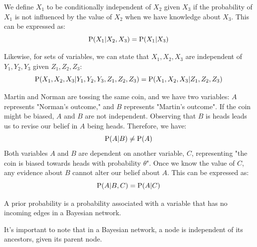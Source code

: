 \begin{definition}
    We define $X_1$ to be conditionally independent of $X_2$ given $X_3$ if the probability of $X_1$ is not influenced by the value of $X_2$ when we have knowledge about $X_3$.  
    This can be expressed as:
    \[\textnormal{P}(X_1|X_2,X_3)=\textnormal{P}(X_1|X_3)\]
\end{definition}
Likewise, for sets of variables, we can state that $X_1, X_2, X_3$ are independent of $Y_1, Y_2, Y_3$ given $Z_1,Z_2,Z_3$:
\[\textnormal{P}(X_1,X_2,X_3|Y_1,Y_2,Y_3,Z_1,Z_2,Z_3)=\textnormal{P}(X_1,X_2,X_3|Z_1,Z_2,Z_3)\]
\begin{example}
    Martin and Norman are tossing the same coin, and we have two variables: $A$ represents "Norman's outcome," and $B$ represents "Martin's outcome". 
    If the coin might be biased, $A$ and $B$ are not independent. 
    Observing that $B$ is heads leads us to revise our belief in $A$ being heads. 
    Therefore, we have:
    \[\textnormal{P}(A|B) \neq \textnormal{P}(A)\]
    Both variables $A$ and $B$ are dependent on another variable, $C$, representing "the coin is biased towards heads with probability $\theta$".
    Once we know the value of $C$, any evidence about $B$ cannot alter our belief about $A$.
    This can be expressed as:
    \[\textnormal{P}(A|B,C)=\textnormal{P}(A|C)\]
\end{example}
\begin{definition}
    A prior probability is a probability associated with a variable that has no incoming edges in a Bayesian network. 
\end{definition}
It's important to note that in a Bayesian network, a node is independent of its ancestors, given its parent node.
